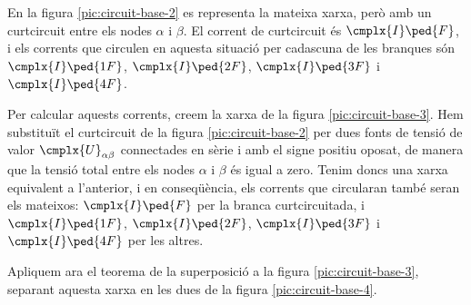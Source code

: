 En la figura \vref{pic:circuit-base-2} es representa la mateixa xarxa, però amb un curtcircuit entre  els nodes $\alpha$ i $\beta$. El corrent de curtcircuit és $\cmplx{I}\ped{F}$, i els corrents que circulen en aquesta situació per cadascuna de les branques són $\cmplx{I}\ped{1F}$, $\cmplx{I}\ped{2F}$, $\cmplx{I}\ped{3F}$ i $\cmplx{I}\ped{4F}$.

\begin{center}
	
	\label{pic:circuit-base-2}
\end{center}


Per  calcular aquests corrents, creem  la xarxa de la figura  \vref{pic:circuit-base-3}. Hem substituït el curtcircuit de la  figura \vref{pic:circuit-base-2} per dues fonts de tensió de valor $\cmplx{U}_{\alpha\beta}$ connectades en sèrie i amb el signe positiu oposat, de manera que la tensió total entre els nodes $\alpha$ i $\beta$ és igual a zero. Tenim doncs una xarxa equivalent a l'anterior, i en conseqüència, els corrents que circularan també seran els mateixos: $\cmplx{I}\ped{F}$ per la branca curtcircuitada, i  $\cmplx{I}\ped{1F}$, $\cmplx{I}\ped{2F}$, $\cmplx{I}\ped{3F}$ i $\cmplx{I}\ped{4F}$ per les altres.

\begin{center}
	
	\label{pic:circuit-base-3}
\end{center}

Apliquem ara el teorema de la superposició a la figura \vref{pic:circuit-base-3}, separant aquesta xarxa en les dues de la figura \vref{pic:circuit-base-4}.

\begin{center}
	
	\label{pic:circuit-base-4}
\end{center}

